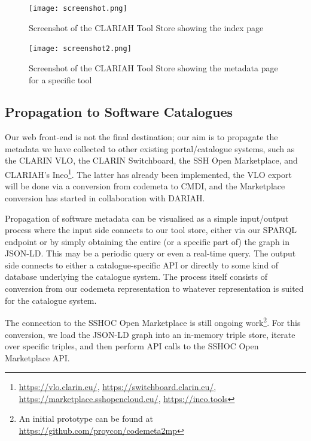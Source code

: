 \documentclass[a4paper,11pt]{article}
\begin{document}
\begin{figure}[h]
\begin{center}
\texttt{[image: screenshot.png]}
\caption{Screenshot of the CLARIAH Tool Store showing the index page}
\label{fig:toolstore1}
\end{center}
\end{figure}

\begin{figure}[h!]
\begin{center}
\texttt{[image: screenshot2.png]}
\caption{Screenshot of the CLARIAH Tool Store showing the metadata page for a specific tool}
\label{fig:toolstore2}
\end{center}
\end{figure}

\subsection{Propagation to Software Catalogues}

Our web front-end is not the final destination; our aim is to propagate the
metadata we have collected to other existing portal/catalogue systems, such as
the CLARIN VLO, the CLARIN Switchboard, the SSH Open Marketplace, and CLARIAH's
Ineo\footnote{\url{https://vlo.clarin.eu/},
\url{https://switchboard.clarin.eu/},
\url{https://marketplace.sshopencloud.eu/}, \url{https://ineo.tools}}. The
latter has already been implemented, the VLO export will be done via a conversion
from codemeta to CMDI, and the Marketplace conversion has started in collaboration with
DARIAH.

Propagation of software metadata can be visualised as a simple input/output
process where the input side connects to our tool store, either via our SPARQL
endpoint or by simply obtaining the entire (or a specific part of) the graph in
JSON-LD. This may be a periodic query or even a real-time query. The output
side connects to either a catalogue-specific API or directly to some kind of
database underlying the catalogue system. The process itself consists of
conversion from our codemeta representation to whatever representation is
suited for the catalogue system.

The connection to the SSHOC Open Marketplace is still ongoing work\footnote{An
initial prototype can be found at
\url{https://github.com/proycon/codemeta2mp}}. For this conversion, we load the
JSON-LD graph into an in-memory triple store, iterate over specific triples, and
then perform API calls to the SSHOC Open Marketplace API.
\end{document}
